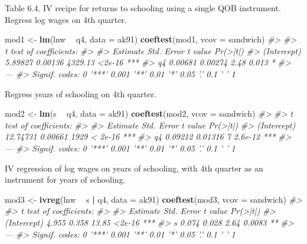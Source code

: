 \documentclass[]{book}
\newenvironment{Shaded}{\begin{snugshade}}{\end{snugshade}}
\newcommand{\CommentTok}[1]{\textcolor[rgb]{0.56,0.35,0.01}{\textit{#1}}}
\newcommand{\DataTypeTok}[1]{\textcolor[rgb]{0.13,0.29,0.53}{#1}}
\newcommand{\KeywordTok}[1]{\textcolor[rgb]{0.13,0.29,0.53}{\textbf{#1}}}
\newcommand{\NormalTok}[1]{#1}
\newcommand{\OperatorTok}[1]{\textcolor[rgb]{0.81,0.36,0.00}{\textbf{#1}}}
\newcommand{\StringTok}[1]{\textcolor[rgb]{0.31,0.60,0.02}{#1}}
\theoremstyle{definition}
\theoremstyle{definition}
\theoremstyle{definition}
\theoremstyle{remark}
\begin{document}
Table 6.4. IV recipe for returns to schooling using a single QOB
instrument. Regress log wages on 4th quarter.

\begin{Shaded}
\begin{Highlighting}[]
\NormalTok{mod1 <-}\StringTok{ }\KeywordTok{lm}\NormalTok{(lnw }\OperatorTok{~}\StringTok{ }\NormalTok{q4, }\DataTypeTok{data =}\NormalTok{ ak91)}
\KeywordTok{coeftest}\NormalTok{(mod1, }\DataTypeTok{vcov =}\NormalTok{ sandwich)}
\CommentTok{#> }
\CommentTok{#> t test of coefficients:}
\CommentTok{#> }
\CommentTok{#>             Estimate Std. Error t value Pr(>|t|)    }
\CommentTok{#> (Intercept)  5.89827    0.00136 4329.13   <2e-16 ***}
\CommentTok{#> q4           0.00681    0.00274    2.48    0.013 *  }
\CommentTok{#> ---}
\CommentTok{#> Signif. codes:  0 '***' 0.001 '**' 0.01 '*' 0.05 '.' 0.1 ' ' 1}
\end{Highlighting}
\end{Shaded}

Regress years of schooling on 4th quarter.

\begin{Shaded}
\begin{Highlighting}[]
\NormalTok{mod2 <-}\StringTok{ }\KeywordTok{lm}\NormalTok{(s }\OperatorTok{~}\StringTok{ }\NormalTok{q4, }\DataTypeTok{data =}\NormalTok{ ak91)}
\KeywordTok{coeftest}\NormalTok{(mod2, }\DataTypeTok{vcov =}\NormalTok{ sandwich)}
\CommentTok{#> }
\CommentTok{#> t test of coefficients:}
\CommentTok{#> }
\CommentTok{#>             Estimate Std. Error t value Pr(>|t|)    }
\CommentTok{#> (Intercept) 12.74731    0.00661    1929  < 2e-16 ***}
\CommentTok{#> q4           0.09212    0.01316       7  2.6e-12 ***}
\CommentTok{#> ---}
\CommentTok{#> Signif. codes:  0 '***' 0.001 '**' 0.01 '*' 0.05 '.' 0.1 ' ' 1}
\end{Highlighting}
\end{Shaded}

IV regression of log wages on years of schooling, with 4th quarter as an
instrument for years of schooling.

\begin{Shaded}
\begin{Highlighting}[]
\NormalTok{mod3 <-}\StringTok{ }\KeywordTok{ivreg}\NormalTok{(lnw }\OperatorTok{~}\StringTok{ }\NormalTok{s }\OperatorTok{|}\StringTok{ }\NormalTok{q4, }\DataTypeTok{data =}\NormalTok{ ak91)}
\KeywordTok{coeftest}\NormalTok{(mod3, }\DataTypeTok{vcov =}\NormalTok{ sandwich)}
\CommentTok{#> }
\CommentTok{#> t test of coefficients:}
\CommentTok{#> }
\CommentTok{#>             Estimate Std. Error t value Pr(>|t|)    }
\CommentTok{#> (Intercept)    4.955      0.358   13.85   <2e-16 ***}
\CommentTok{#> s              0.074      0.028    2.64   0.0083 ** }
\CommentTok{#> ---}
\CommentTok{#> Signif. codes:  0 '***' 0.001 '**' 0.01 '*' 0.05 '.' 0.1 ' ' 1}
\end{Highlighting}
\end{Shaded}
\end{document}
